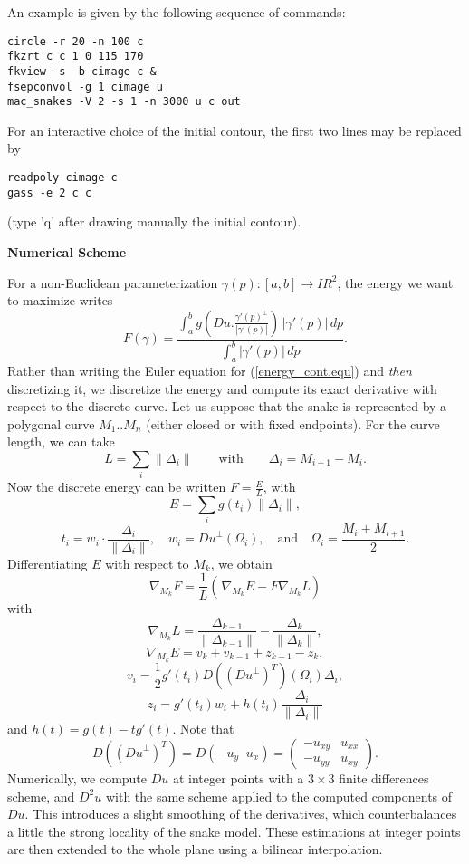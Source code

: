 An example is given by the following sequence of commands:

\begin{verbatim}
circle -r 20 -n 100 c
fkzrt c c 1 0 115 170
fkview -s -b cimage c &
fsepconvol -g 1 cimage u
mac_snakes -V 2 -s 1 -n 3000 u c out
\end{verbatim}

For an interactive choice of the initial
contour, the first two lines may be replaced by 
\begin{verbatim}
readpoly cimage c
gass -e 2 c c
\end{verbatim}
(type 'q' after drawing manually the initial contour).

\newpage

\centerline {\bf \large Numerical Scheme}

\vskip 6mm

For a non-Euclidean
parameterization $\gamma(p):[a,b]\to I\!\!R^2$, the energy we want to
maximize writes
\begin{equation}
F(\gamma) = \frac{\int_a^b g\left(Du.\frac{\gamma'(p)^\perp}{|\gamma'(p)|}\right) \,|\gamma'(p)|\, dp}
{\int_a^b |\gamma'(p)|\, dp}.
\label{energy_cont.equ}
\end{equation}
Rather than writing the Euler equation for (\ref{energy_cont.equ})
and {\it then} discretizing it, we discretize the energy and
compute its exact derivative with respect to the discrete curve.
Let us suppose that the snake is represented by a polygonal curve
$M_1..M_n$ (either closed or with fixed endpoints). For the curve
length, we can take
$$L = \sum_i \|\Delta_i\|\qquad\mathrm{with}\qquad \Delta_i=M_{i+1}-M_i.$$
Now the discrete energy can be written $F = \frac EL$,
with
$$E=\sum_i g(t_i)\|\Delta_i\|,$$
$$t_i = w_i \cdot \frac{\Delta_i}{\|\Delta_i\|},\quad
w_i = {D u}^{\bot}(\Omega_i),\quad \mathrm{and}\quad \Omega_i =
\frac{M_i+M_{i+1}}2.$$ Differentiating $E$ with respect to $M_k$,
we obtain
$$\nabla_{M_k} F = \frac 1L \left( \frac{}{}\!\!
\nabla_{M_k} E- F\nabla_{M_k} L\right)$$
with
$$\nabla_{M_k} L= \frac{\Delta_{k-1}}{\|\Delta_{k-1}\|}
- \frac{\Delta_k}{\|\Delta_k\|},$$
$$\nabla_{M_k} E= v_k+v_{k-1}+z_{k-1}-z_k,$$
$$v_i = \frac 12
g'(t_i)D(({D u}^{\bot})^T)(\Omega_i) \Delta_i,$$
$$z_i = g'(t_i) w_i +h(t_i)\frac{\Delta_i}{\|\Delta_i\|}$$
and $h(t)=g(t)-tg'(t)$. Note that
$$D(({D u}^{\bot})^T)
= D ( -u_y\;\; u_x) = \left(\begin{array}{cc}
-u_{xy} & u_{xx} \\
-u_{yy} & u_{xy}
\end{array}\right).$$
Numerically, we compute $Du$ at integer points
with a $3\times 3$ finite differences scheme,
and $D^2 u$ with the same scheme applied to the computed components of
$Du$. This introduces a slight smoothing of the derivatives, which
counterbalances a little the strong locality of the snake model.
These estimations at integer points are then extended to the whole
plane using a bilinear interpolation.

